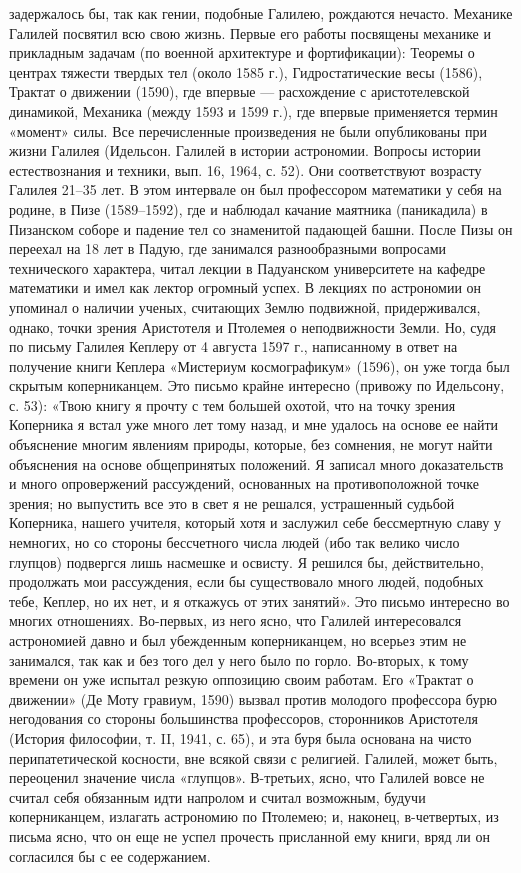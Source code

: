 задержалось бы, так как гении, подобные Галилею, рождаются нечасто.
Механике Галилей посвятил всю свою жизнь. Первые его работы посвящены
механике и прикладным задачам (по военной архитектуре и фортификации):
Теоремы о центрах тяжести твердых тел (около 1585 г.), Гидростатические
весы (1586), Трактат о движении (1590), где впервые --- расхождение с
аристотелевской динамикой, Механика (между 1593 и 1599 г.), где впервые
применяется термин «момент» силы. Все перечисленные произведения не были
опубликованы при жизни Галилея (Идельсон. Галилей в истории астрономии.
Вопросы истории естествознания и техники, вып. 16, 1964, с. 52). Они
соответствуют возрасту Галилея 21--35 лет. В этом интервале он был
профессором математики у себя на родине, в Пизе (1589--1592), где и наблюдал
качание маятника (паникадила) в Пизанском соборе и падение тел со
знаменитой падающей башни. После Пизы он переехал на 18 лет в Падую, где
занимался разнообразными вопросами технического характера, читал лекции в
Падуанском университете на кафедре математики и имел как лектор огромный
успех. В лекциях по астрономии он упоминал о наличии ученых, считающих
Землю подвижной, придерживался, однако, точки зрения Аристотеля и Птолемея о
неподвижности Земли. Но, судя по письму Галилея Кеплеру от 4 августа 1597 г.,
написанному в ответ на получение книги Кеплера «Мистериум космографикум»
(1596), он уже тогда был скрытым коперниканцем. Это письмо крайне интересно
(привожу по Идельсону, с. 53): «Твою книгу я прочту с тем большей охотой, что
на точку зрения Коперника я встал уже много лет тому назад, и мне удалось на
основе ее найти объяснение многим явлениям природы, которые, без сомнения, не
могут найти объяснения на основе общепринятых положений. Я записал много
доказательств и много опровержений рассуждений, основанных на
противоположной точке зрения; но выпустить все это в свет я не решался,
устрашенный судьбой Коперника, нашего учителя, который хотя и заслужил себе
бессмертную славу у немногих, но со стороны бессчетного числа людей (ибо так
велико число глупцов) подвергся лишь насмешке и освисту. Я решился бы,
действительно, продолжать мои рассуждения, если бы существовало много
людей, подобных тебе, Кеплер, но их нет, и я откажусь от этих занятий». Это
письмо интересно во многих отношениях. Во-первых, из него ясно, что Галилей
интересовался астрономией давно и был
убежденным коперниканцем, но всерьез этим не занимался, так как и без того дел
у него было по горло. Во-вторых, к тому времени он уже испытал резкую
оппозицию своим работам. Его «Трактат о движении» (Де Моту гравиум, 1590)
вызвал против молодого профессора бурю негодования со стороны большинства
профессоров, сторонников Аристотеля (История философии, т. II, 1941, с.
65), и эта буря была основана на чисто перипатетической косности, вне
всякой связи с религией. Галилей, может быть, переоценил значение числа
«глупцов». В-третьих, ясно, что Галилей вовсе не считал себя обязанным идти
напролом и считал возможным, будучи коперниканцем, излагать астрономию по
Птолемею; и, наконец, в-четвертых, из письма ясно, что он еще не успел
прочесть присланной ему книги, вряд ли он согласился бы с ее содержанием.

